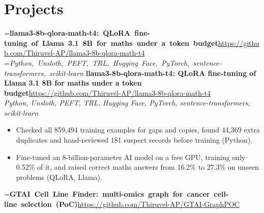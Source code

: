 \documentclass[a4paper,11pt]{article}
\newcommand{\project}[3]{%
  \textbf{#1}\hfill#3\\ {\color{muted}\small\textit{#2}}\par}
\newcommand{\gap}{\vspace{5pt}}
\begin{document}
\section{Projects}
=\hbox{\textbf{llama3-8b-qlora-math-t4: QLoRA fine-tuning of Llama 3.1 8B for maths under a token budget}\hspace{1em}\url{https://github.com/Thiruvel-AP/llama3-8b-qlora-math-t4}}%
=\hbox{{\small\textit{Python, Unsloth, PEFT, TRL, Hugging Face, PyTorch, sentence-transformers, scikit-learn}}}%
\ifdim\wd0>\linewidth
\ifdim\wd2>\linewidth
\textbf{llama3-8b-qlora-math-t4: QLoRA fine-tuning of Llama 3.1 8B for maths under a token budget}\\ {\color{muted}\small\textit{Python, Unsloth, PEFT, TRL, Hugging Face, PyTorch, sentence-transformers, scikit-learn}}\\ \hspace*{\fill}{\small\url{https://github.com/Thiruvel-AP/llama3-8b-qlora-math-t4}}\par
\else
\textbf{llama3-8b-qlora-math-t4: QLoRA fine-tuning of Llama 3.1 8B for maths under a token budget}\\ {\color{muted}\small\textit{Python, Unsloth, PEFT, TRL, Hugging Face, PyTorch, sentence-transformers, scikit-learn}}\hfill{\small\url{https://github.com/Thiruvel-AP/llama3-8b-qlora-math-t4}}\par
\fi
\else
\project{llama3-8b-qlora-math-t4: QLoRA fine-tuning of Llama 3.1 8B for maths under a token budget}{Python, Unsloth, PEFT, TRL, Hugging Face, PyTorch, sentence-transformers, scikit-learn}{\url{https://github.com/Thiruvel-AP/llama3-8b-qlora-math-t4}}
\fi
\begin{itemize}
  \item Checked all 859,494 training examples for gaps and copies, found 44,369 extra duplicates and hand-reviewed 181 suspect records before training (Python).
  \item Fine-tuned an 8-billion-parameter AI model on a free GPU, training only 0.52\% of it, and raised correct maths answers from 16.2\% to 27.3\% on unseen problems (QLoRA, Llama).
\end{itemize}
\gap
{}
=\hbox{\textbf{GTAI Cell Line Finder: multi-omics graph for cancer cell-line selection (PoC)}\hspace{1em}\url{https://github.com/Thiruvel-AP/GTAI-GraphPOC}}%
\end{document}
